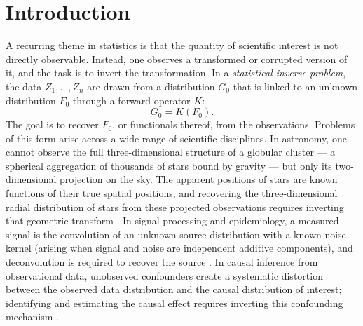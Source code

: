 
\chapter{Introduction}\label{chap:intro}

A recurring theme in statistics is that the quantity of scientific interest is not directly observable. Instead, one observes a transformed or corrupted version of it, and the task is to invert the transformation. In a \textit{statistical inverse problem}, the data $Z_1,\ldots,Z_n$ are drawn from a distribution $G_0$ that is linked to an unknown distribution $F_0$ through a forward operator $K$:
\[
G_0 = K(F_0).
\]
The goal is to recover $F_0$, or functionals thereof, from the observations. Problems of this form arise across a wide range of scientific disciplines. In astronomy, one cannot observe the full three-dimensional structure of a globular cluster --- a spherical aggregation of thousands of stars bound by gravity --- but only its two-dimensional projection on the sky. The apparent positions of stars are known functions of their true spatial positions, and recovering the three-dimensional radial distribution of stars from these projected observations requires inverting that geometric transform \cite{33,14}. In signal processing and epidemiology, a measured signal is the convolution of an unknown source distribution with a known noise kernel (arising when signal and noise are independent additive components), and deconvolution is required to recover the source \cite{84,83}. In causal inference from observational data, unobserved confounders create a systematic distortion between the observed data distribution and the causal distribution of interest; identifying and estimating the causal effect requires inverting this confounding mechanism \cite{120,205}. 

